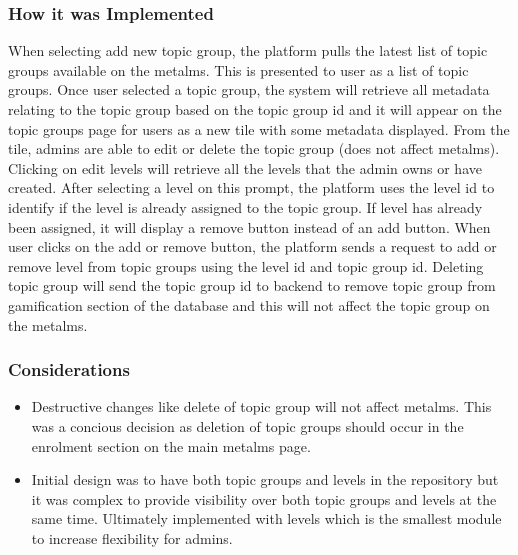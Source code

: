 \subsubsection{How it was Implemented}
When selecting add new topic group, the platform pulls the latest list of topic groups available on the metalms. This is presented to user as a list of topic groups. Once user selected a topic group, the system will retrieve all metadata relating to the topic group based on the topic group id and it will appear on the topic groups page for users as a new tile with some metadata displayed. From the tile, admins are able to edit or delete the topic group (does not affect metalms). Clicking on edit levels will retrieve all the levels that the admin owns or have created. After selecting a level on this prompt, the platform uses the level id to identify if the level is already assigned to the topic group. If level has already been assigned, it will display a remove button instead of an add button. When user clicks on the add or remove button, the platform sends a request to add or remove level from topic groups using the level id and topic group id. Deleting topic group will send the topic group id to backend to remove topic group from gamification section of the database and this will not affect the topic group on the metalms. 

\subsubsection{Considerations}
\begin{itemize}
    \item Destructive changes like delete of topic group will not affect metalms. This was a concious decision as deletion of topic groups should occur in the enrolment section on the main metalms page.
    \item Initial design was to have both topic groups and levels in the repository but it was complex to provide visibility over both topic groups and levels at the same time. Ultimately implemented with levels which is the smallest module to increase flexibility for admins.
\end{itemize}

\newpage